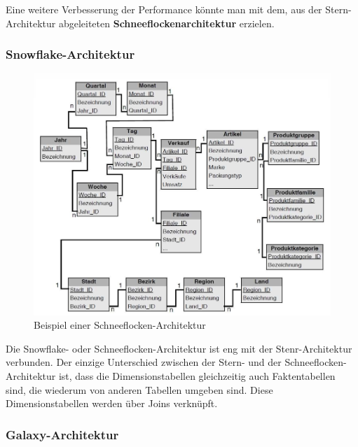 \documentclass[a4paper, 11pt, nofootinbib]{article}
\begin{document}
\vspace{10px}

\noindent Eine weitere Verbesserung der Performance könnte man mit dem, aus der Stern-Architektur abgeleiteten \textbf{Schneeflockenarchitektur} erzielen.

\newpage

\subsubsection{Snowflake-Architektur}
\begin{figure}
	\centering
	\includegraphics[keepaspectratio=true,height=18\baselineskip]{snowflake.PNG}
	\caption{Beispiel einer Schneeflocken-Architektur}
	\label{label}
\end{figure}

Die Snowflake- oder Schneeflocken-Architektur ist eng mit der Stenr-Architektur verbunden. Der einzige Unterschied zwischen der Stern- und der Schneeflocken-Architektur ist, dass die Dimensionstabellen gleichzeitig auch Faktentabellen sind, die wiederum von anderen Tabellen umgeben sind. Diese Dimensionstabellen werden über Joins verknüpft. 

\subsubsection{Galaxy-Architektur}
\end{document}
